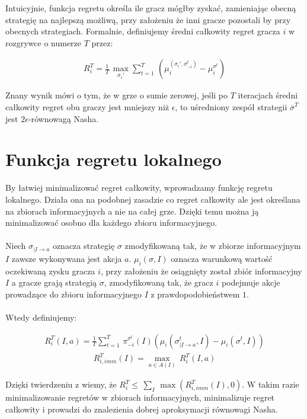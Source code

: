 \documentclass[licencjacka]{pracamgr}
\begin{document}
\noindent
Intuicyjnie, funkcja regretu określa ile gracz mógłby zyskać, zamieniając obecną strategię na najlepszą możliwą,
przy założeniu że inni gracze pozostali by przy obecnych strategiach. Formalnie, definiujemy średni całkowity regret gracza $i$
w rozgrywce o numerze $T$ przez:

\begin{align*}
R_i^T = \frac{1}{T} \, \max_{\sigma_i'} \sum\limits_{t=1}^T \, (\mu_i^{(\sigma_i', \sigma_{-i}^t)} - \mu_i^{\sigma^t})
\end{align*}

\noindent
Znany wynik \cite{cfr} mówi o tym, że w grze o sumie zerowej, jeśli po $T$ iteracjach średni całkowity regret obu graczy
jest mniejszy niż $\epsilon$, to uśredniony zespół strategii $\overline{\sigma}^T$ jest $2\epsilon$-równowagą Nasha.

\section{Funkcja regretu lokalnego}

By łatwiej minimalizować regret całkowity, wprowadzamy funkcję regretu lokalnego.
Działa ona na podobnej zasadzie co regret całkowity ale jest określana na zbiorach informacyjnych
a nie na całej grze. Dzięki temu można ją minimalizować osobno dla każdego zbioru informacyjnego. \\\\

\noindent
Niech $\sigma_{|I \rightarrow a}$ oznacza strategię $\sigma$ zmodyfikowaną tak, że w zbiorze informacyjnym $I$ zawsze
wykonywana jest akcja $a$. $\mu_i(\sigma, I)$ oznacza warunkową wartość oczekiwaną zysku gracza $i$, przy założeniu że
osiągnięty został zbiór informacyjny $I$ a gracze grają strategią $\sigma$, zmodyfikowaną tak, że gracz $i$
podejmuje akcje prowadzące do zbioru informacyjnego $I$ z prawdopodobieństwem $1$. \\\\

\noindent
Wtedy definiujemy:

\begin{align*}
R_i^T(I, a) = \frac{1}{T} \sum\limits_{t=1}^{T} \, \pi_{-i}^{\sigma^t}(I)(\mu_i(\sigma^t_{|I \rightarrow a}, I) - \mu_i(\sigma^t, I))
\end{align*}
\begin{align*}
R_{i, imm}^T(I) = \max_{a \in A(I)} \, R_i^T(I, a)
\end{align*}

\noindent
Dzięki twierdzeniu z \cite{cfr} wiemy, że $R_i^T \leq \, \sum_{I} \, \max(R_{i, imm}^T(I), 0)$. W takim razie
minimalizowanie regretów w zbiorach informacyjnych, minimalizuje regret całkowity i prowadzi do znalezienia
dobrej aproksymacji równowagi Nasha. \\
\end{document}
